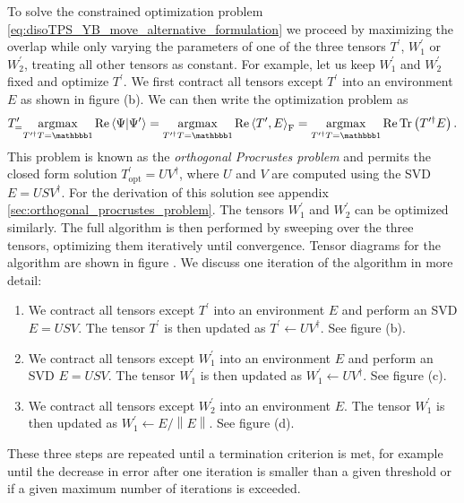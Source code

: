 To solve the constrained optimization problem \eqref{eq:disoTPS_YB_move_alternative_formulation} we proceed by maximizing the overlap while only varying the parameters of one of the three tensors $T^\prime$, $W_1^\prime$ or $W_2^\prime$, treating all other tensors as constant. For example, let us keep $W_1^\prime$ and $W_2^\prime$ fixed and optimize $T^\prime$. We first contract all tensors except $T^\prime$ into an environment $E$ as shown in figure (b). We can then write the optimization problem as
\begin{equation}
	T^\prime_\text = \underset{T^{\prime\dagger}T = \id}{\argmax} \Re\left\langle\Psi\middle|\Psi^\prime\right\rangle = \underset{T^{\prime\dagger}T = \id}{\argmax}\Re\left\langle T^\prime, E\right\rangle_\text{F} = \underset{T^{\prime\dagger}T = \id}{\argmax}\Re\Tr\left(T^{\prime\dagger}E\right).
\end{equation}
This problem is known as the \textit{orthogonal Procrustes problem} and permits the closed form solution $T^\prime_\text{opt} = UV^\dagger$, where $U$ and $V$ are computed using the SVD $E = USV^\dagger$. For the derivation of this solution see appendix \ref{sec:orthogonal_procrustes_problem}. The tensors $W_1^\prime$ and $W_2^\prime$ can be optimized similarly. The full algorithm is then performed by sweeping over the three tensors, optimizing them iteratively until convergence. Tensor diagrams for the algorithm are shown in figure . We discuss one iteration of the algorithm in more detail:
\begin{enumerate}
	\item We contract all tensors except $T^\prime$ into an environment $E$ and perform an SVD $E = USV$. The tensor $T^\prime$ is then updated as $T^\prime\leftarrow UV^\dagger$. See figure (b).
	\item We contract all tensors except $W_1^\prime$ into an environment $E$ and perform an SVD $E = USV$. The tensor $W_1^\prime$ is then updated as $W_1^\prime\leftarrow UV^\dagger$. See figure (c).
	\item We contract all tensors except $W_2^\prime$ into an environment $E$. The tensor $W_1^\prime$ is then updated as $W_1^\prime\leftarrow E/\left\lVert E\right\rVert$. See figure (d).
\end{enumerate}
These three steps are repeated until a termination criterion is met, for example until the decrease in error after one iteration is smaller than a given threshold or if a given maximum number of iterations is exceeded.
